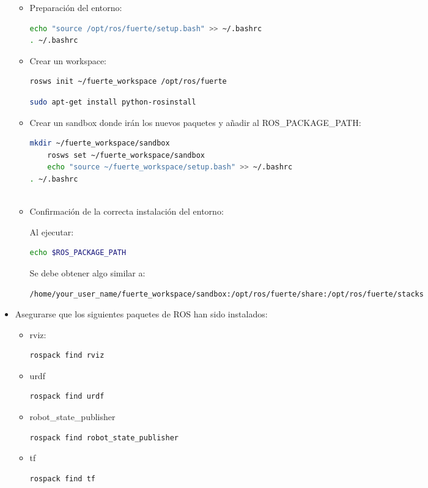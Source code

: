\documentclass[12pt,a4paper,final,twoside]{article}
\begin{document}
\begin{itemize}
\begin{itemize}
\item Preparación del entorno:
\begin{lstlisting}[language=bash]
	echo "source /opt/ros/fuerte/setup.bash" >> ~/.bashrc
. ~/.bashrc
\end{lstlisting}

\item Crear un workspace:
\begin{lstlisting}[language=bash]
	rosws init ~/fuerte_workspace /opt/ros/fuerte
\end{lstlisting}
\begin{lstlisting}[language=bash]
	sudo apt-get install python-rosinstall
\end{lstlisting}
\item Crear un sandbox donde irán los nuevos paquetes y añadir al ROS{\_}PACKAGE{\_}PATH:
\begin{lstlisting}[language=bash]
	mkdir ~/fuerte_workspace/sandbox
	rosws set ~/fuerte_workspace/sandbox
	echo "source ~/fuerte_workspace/setup.bash" >> ~/.bashrc
. ~/.bashrc
	
\end{lstlisting}
\item Confirmación de la correcta instalación del entorno:

Al ejecutar:
\begin{lstlisting}[language=bash]
	echo $ROS_PACKAGE_PATH
\end{lstlisting}
Se debe obtener algo similar a:
\begin{lstlisting}[language=bash]
	/home/your_user_name/fuerte_workspace/sandbox:/opt/ros/fuerte/share:/opt/ros/fuerte/stacks
\end{lstlisting}
\end{itemize}

\item Asegurarse que los siguientes paquetes de ROS han sido instalados:
\begin{itemize}
\item rviz:
\begin{lstlisting}[language=bash]
	rospack find rviz
\end{lstlisting}
\item urdf
\begin{lstlisting}[language=bash]
	rospack find urdf
\end{lstlisting}
\item robot{\_}state{\_}publisher
\begin{lstlisting}[language=bash]
	rospack find robot_state_publisher
\end{lstlisting}
\item tf
\begin{lstlisting}[language=bash]
	rospack find tf
\end{lstlisting}



\end{itemize}
\end{itemize}
\end{document}
